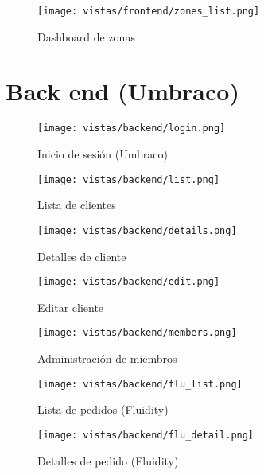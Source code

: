 \begin{figure}[H]
    \texttt{[image: vistas/frontend/zones\_list.png]}
    \caption{Dashboard de zonas}
    \label{fig:frontend:zones_list}
    \centering
\end{figure}

\section{Back end (Umbraco)}
\begin{figure}[H]
    \texttt{[image: vistas/backend/login.png]}
    \caption{Inicio de sesión (Umbraco)}
    \label{fig:backend:login}
    \centering
\end{figure}

\begin{figure}[H]
    \texttt{[image: vistas/backend/list.png]}
    \caption{Lista de clientes}
    \label{fig:backend:list}
    \centering
\end{figure}

\begin{figure}[H]
    \texttt{[image: vistas/backend/details.png]}
    \caption{Detalles de cliente}
    \label{fig:backend:details}
    \centering
\end{figure}

\begin{figure}[H]
    \texttt{[image: vistas/backend/edit.png]}
    \caption{Editar cliente}
    \label{fig:backend:edit}
    \centering
\end{figure}

\begin{figure}[H]
    \texttt{[image: vistas/backend/members.png]}
    \caption{Administración de miembros}
    \label{fig:backend:members}
    \centering
\end{figure}

\begin{figure}[H]
    \texttt{[image: vistas/backend/flu\_list.png]}
    \caption{Lista de pedidos (Fluidity)}
    \label{fig:backend:flu_list}
    \centering
\end{figure}

\begin{figure}[H]
    \texttt{[image: vistas/backend/flu\_detail.png]}
    \caption{Detalles de pedido (Fluidity)}
    \label{fig:backend:flu_detail}
    \centering
\end{figure}